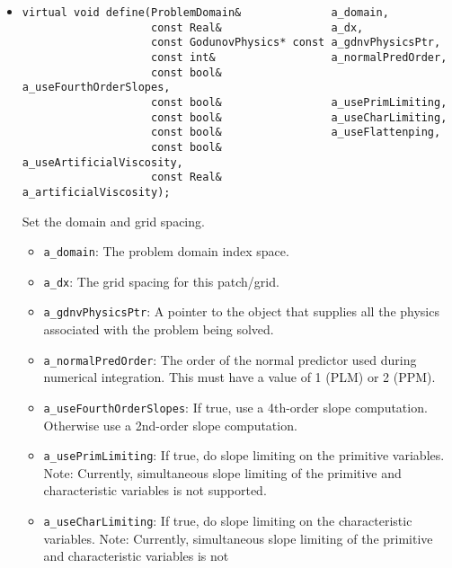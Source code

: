 \begin{itemize}
\item \begin{small}\begin{verbatim}
virtual void define(ProblemDomain&              a_domain,
                    const Real&                 a_dx,
                    const GodunovPhysics* const a_gdnvPhysicsPtr,
                    const int&                  a_normalPredOrder,
                    const bool&                 a_useFourthOrderSlopes,
                    const bool&                 a_usePrimLimiting,
                    const bool&                 a_useCharLimiting,
                    const bool&                 a_useFlattenping,
                    const bool&                 a_useArtificialViscosity,
                    const Real&                 a_artificialViscosity);
\end{verbatim}\end{small}
Set the domain and grid spacing.
\begin{itemize}
\item \verb/a_domain/:  The problem domain index space.
\vspace{-0.07in}
\item \verb/a_dx/:  The grid spacing for this patch/grid.
\vspace{-0.07in}
\item \verb/a_gdnvPhysicsPtr/:  A pointer to the object that supplies all the
physics associated with the problem being solved.
\vspace{-0.07in}
\item \verb/a_normalPredOrder/:  The order of the normal predictor used
        during numerical integration.  This must have a value of 1 (PLM) or 2
        (PPM).
\vspace{-0.07in}
\item \verb/a_useFourthOrderSlopes/:  If true, use a 4th-order slope
        computation.  Otherwise use a 2nd-order slope computation.
\vspace{-0.07in}
\item \verb/a_usePrimLimiting/:  If true, do slope limiting on the primitive
        variables.  Note:  Currently, simultaneous slope limiting of the
        primitive and characteristic variables is not supported.
\vspace{-0.07in}
\item \verb/a_useCharLimiting/:  If true, do slope limiting on the
        characteristic variables.  Note:  Currently, simultaneous slope
        limiting of the primitive and characteristic variables is not

\end{itemize}
\end{itemize}
